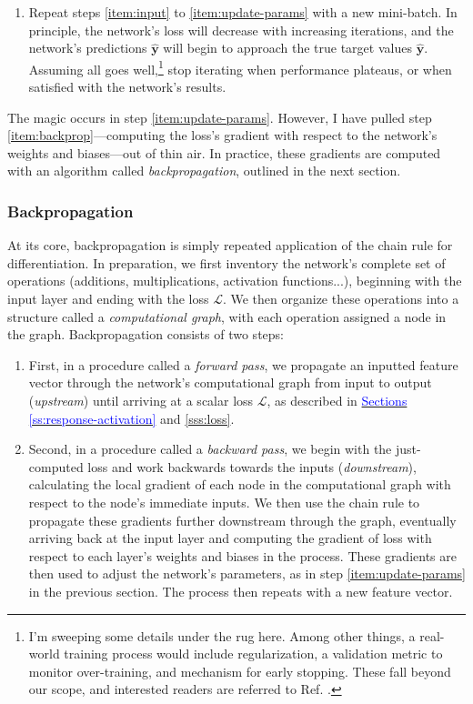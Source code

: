 \documentclass[11pt, a4paper]{article}
\newcommand{\myhref}[2]{\hyperref[#1]{\textcolor{blue}{#2}}}
\renewcommand{\vec}[1]{\bm{#1}}
\newcommand{\y}{\vec{y}}
\begin{document}
\begin{enumerate}
    \item Repeat steps \ref{item:input} to \ref{item:update-params} with a new mini-batch. In principle, the network's loss will decrease with increasing iterations, and the network's predictions $ \hat{\y} $ will begin to approach the true target values $ \hat{\y} $. Assuming all goes well,\footnote{I'm sweeping some details under the rug here. Among other things, a real-world training process would include regularization, a validation metric to monitor over-training, and mechanism for early stopping. These fall beyond our scope, and interested readers are referred to Ref. \cite{homl}.} stop iterating when performance plateaus, or when satisfied with the network's results.

\end{enumerate}
The magic occurs in step \ref{item:update-params}. However, I have pulled step \ref{item:backprop}---computing the loss's gradient with respect to the network's weights and biases---out of thin air. In practice, these gradients are computed with an algorithm called \textit{backpropagation}, outlined in the next section.

\subsubsection{Backpropagation}
At its core, backpropagation is simply repeated application of the chain rule for differentiation. In preparation, we first inventory the network's complete set of operations (additions, multiplications, activation functions...), beginning with the input layer and ending with the loss $ \mathcal{L} $. We then organize these operations into a structure called a \textit{computational graph}, with each operation assigned a node in the graph. Backpropagation consists of two steps:
\begin{enumerate}

    \item First, in a procedure called a \textit{forward pass}, we propagate an inputted feature vector through the network's computational graph from input to output (\textit{upstream}) until arriving at a scalar loss $ \mathcal{L} $, as described in \myhref{ss:response-activation}{Sections \ref{ss:response-activation}} and \ref{sss:loss}. 

    \item Second, in a procedure called a \textit{backward pass}, we begin with the just-computed loss and work backwards towards the inputs (\textit{downstream}), calculating the local gradient of each node in the computational graph with respect to the node's immediate inputs. We then use the chain rule to propagate these gradients further downstream through the graph, eventually arriving back at the input layer and computing the gradient of loss with respect to each layer's weights and biases in the process. These gradients are then used to adjust the network's parameters, as in step \ref{item:update-params} in the previous section. The process then repeats with a new feature vector.

\end{enumerate}
\end{document}
